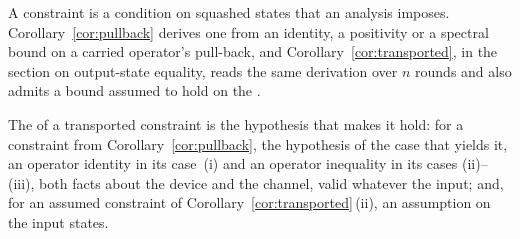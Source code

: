 
A constraint is a condition on squashed states that an analysis imposes.
Corollary~\ref{cor:pullback} derives one from an identity, a positivity or a
spectral bound on a carried operator's pull-back, and
Corollary~\ref{cor:transported}, in the section on
output-state equality, reads the same derivation over $n$ rounds and also
admits a bound assumed to hold on the .

\begin{definition}\label{def:certificate}
The
of a transported constraint is the hypothesis that makes it hold: for a
constraint from Corollary~\ref{cor:pullback}, the hypothesis of the case that
yields it, an operator identity in its case~(i) and an operator inequality in
its cases (ii)--(iii), both facts about the device and the channel, valid
whatever the input; and, for an assumed constraint of
Corollary~\ref{cor:transported}\,(ii), an assumption on the input states.
\end{definition}
